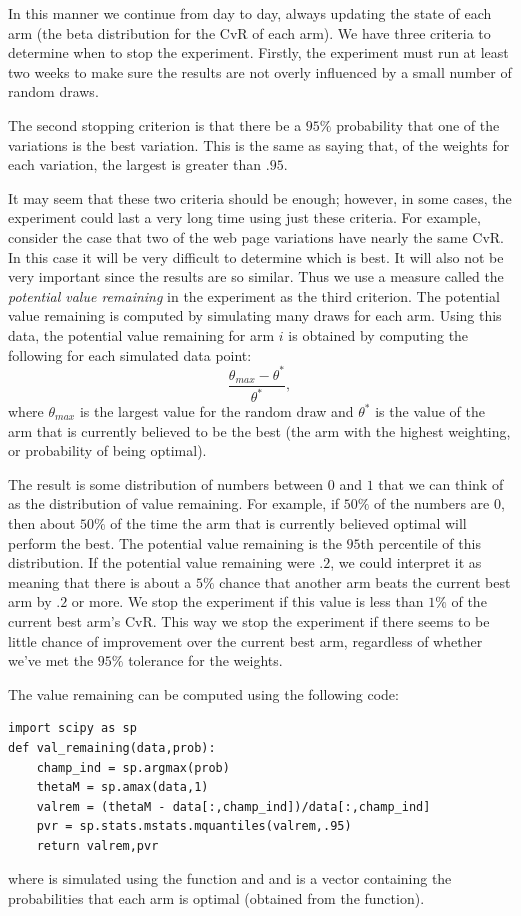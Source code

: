 In this manner we continue from day to day, always updating the state of each arm
(the beta distribution for the CvR of each arm).  We have three criteria to determine
when to stop the experiment.
Firstly, the experiment must run at least two weeks to make sure the
results are not overly influenced by a small number of random draws.

The second stopping criterion is that there be a $95\%$ probability that one
of the variations is the best variation.
This is the same as saying that, of the weights for each variation, the largest
is greater than $.95$.

It may seem that these two criteria should be enough; however, in some cases, the
experiment could last a very long time using just these criteria.
For example, consider the case that two of the web page variations have nearly the same CvR.
In this case it will be very difficult to determine which is best.
It will also not be very important since the results are so similar.
Thus we use a measure called the \emph{potential value remaining}
in the experiment as the third criterion.  The potential value remaining is computed by
simulating many draws for each arm.  Using this data, the potential value remaining
for arm $i$ is obtained by computing the following for each simulated data point:
\begin{equation}\label{valrem}
\frac{\theta_{max} - \theta^*}{\theta^*},
\end{equation}
where $\theta_{max}$ is the largest value for the random draw and $\theta^*$ is the
value of the arm that is currently believed to be the best
(the arm with the highest weighting, or probability of being optimal).

The result is some distribution of numbers between $0$ and $1$ that we can think
of as the distribution of value remaining.  For example, if $50\%$ of the numbers are 0,
then about $50\%$ of the time the arm that is currently believed optimal will perform the best.
The potential value remaining is the $95$th percentile of this distribution.
If the potential value remaining were $.2$, we could interpret it as meaning
that there is about a $5\%$ chance that another arm beats the current best arm by $.2$ or more.
We stop the experiment if this value is less than $1\%$ of the current best arm's CvR.
This way we stop the experiment if there seems to be little chance of improvement over
the current best arm, regardless of whether we've met the $95\%$ tolerance for the weights.

The value remaining can be computed using the following code:
\begin{lstlisting}
import scipy as sp
def val_remaining(data,prob):
    champ_ind = sp.argmax(prob)
    thetaM = sp.amax(data,1)
    valrem = (thetaM - data[:,champ_ind])/data[:,champ_ind]
    pvr = sp.stats.mstats.mquantiles(valrem,.95)
    return valrem,pvr
\end{lstlisting}
where  is simulated using the  function and
and  is a vector containing the probabilities that each arm is optimal
(obtained from the  function).

